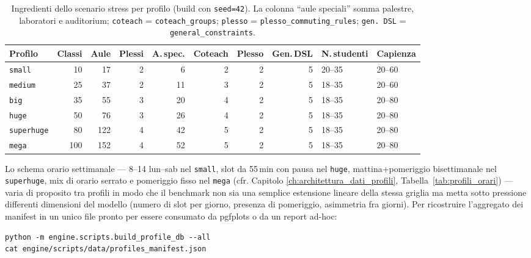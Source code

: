\begin{table}[h]
\centering
\caption{Ingredienti dello scenario stress per profilo (build con
   \texttt{seed=42}). La colonna ``aule speciali'' somma palestre,
   laboratori e auditorium; \texttt{coteach} = \texttt{coteach\_groups};
   \texttt{plesso} = \texttt{plesso\_commuting\_rules};
   \texttt{gen.\,DSL} = \texttt{general\_constraints}.}
\label{tab:stress_profili}
\footnotesize
\begin{tabular}{lrrrrrrrll}
\toprule
\textbf{Profilo} & \textbf{Classi} & \textbf{Aule} & \textbf{Plessi}
& \textbf{A.\,spec.} & \textbf{Coteach} & \textbf{Plesso}
& \textbf{Gen.\,DSL} & \textbf{N.\,studenti} & \textbf{Capienza} \\
\midrule
\texttt{small}     &   10 &   17 & 2 &  6 &  2 & 2 &  5 & 20--35 & 20--60 \\
\texttt{medium}    &   25 &   37 & 2 & 11 &  3 & 2 &  5 & 18--35 & 20--60 \\
\texttt{big}       &   35 &   55 & 3 & 20 &  4 & 2 &  5 & 18--35 & 20--80 \\
\texttt{huge}      &   50 &   76 & 3 & 26 &  4 & 2 &  5 & 18--35 & 20--80 \\
\texttt{superhuge} &   80 &  122 & 4 & 42 &  5 & 2 &  5 & 18--35 & 20--80 \\
\texttt{mega}      &  100 &  152 & 4 & 52 &  5 & 2 &  5 & 18--35 & 20--80 \\
\bottomrule
\end{tabular}
\end{table}

Lo schema orario settimanale --- 8--14 lun--sab nel \texttt{small},
slot da 55\,min con pausa nel \texttt{huge}, mattina+pomeriggio
bisettimanale nel \texttt{superhuge}, mix di orario serrato e
pomeriggio fisso nel \texttt{mega} (cfr. Capitolo
\ref{ch:architettura_dati_profili}, Tabella~\ref{tab:profili_orari})
--- varia di proposito tra profili in modo che il benchmark non
sia una semplice estensione lineare della stessa griglia ma
metta sotto pressione differenti dimensioni del modello (numero
di slot per giorno, presenza di pomeriggio, asimmetria fra giorni).
Per ricostruire l'aggregato dei manifest in un unico file pronto
per essere consumato da pgfplots o da un report ad-hoc:

\begin{lstlisting}[style=shell]
python -m engine.scripts.build_profile_db --all
cat engine/scripts/data/profiles_manifest.json
\end{lstlisting}

